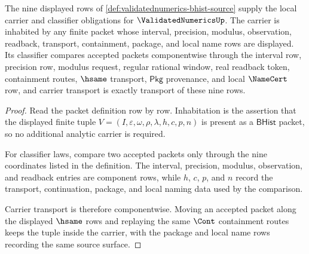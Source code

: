 \begin{theorem}
\label{thm:validatednumerics-carrier-classifier-obligations}
The nine displayed rows of
\autoref{def:validatednumerics-bhist-source} supply the local carrier and
classifier obligations for $\ValidatedNumericsUp$. The carrier is inhabited by
any finite packet whose interval, precision, modulus, observation, readback,
transport, containment, package, and local name rows are displayed. Its
classifier compares accepted packets componentwise through the interval row,
precision row, modulus request, regular rational window, real readback token,
containment routes, $\hsame$ transport, $\mathsf{Pkg}$ provenance, and local
$\NameCert$ row, and carrier transport is exactly transport of these nine rows.
\end{theorem}
\begin{proof}
Read the packet definition row by row. Inhabitation is the assertion that the
displayed finite tuple
$V=(I,\varepsilon,\omega,\rho,\lambda,h,c,p,n)$ is present as a
$\mathsf{BHist}$ packet, so no additional analytic carrier is required.

For classifier laws, compare two accepted packets only through the nine
coordinates listed in the definition. The interval, precision, modulus,
observation, and readback entries are component rows, while $h$, $c$, $p$, and
$n$ record the transport, continuation, package, and local naming data used by
the comparison.

Carrier transport is therefore componentwise. Moving an accepted packet along
the displayed $\hsame$ rows and replaying the same $\Cont$ containment routes
keeps the tuple inside the carrier, with the package and local name rows
recording the same source surface.
\end{proof}

